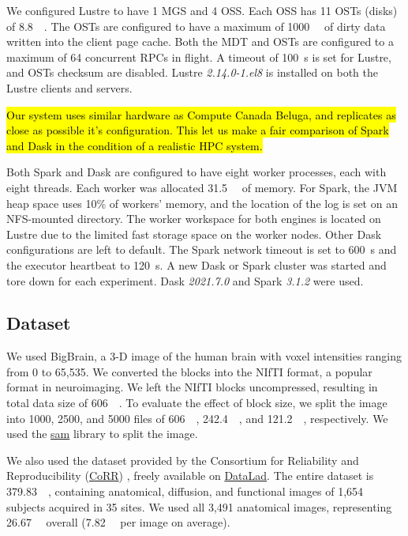 \documentclass[AMA,STIX1COL]{WileyNJD-v2}
\newcommand{\HL}[1]{\hl{#1}}
\begin{document}
We configured Lustre to have 1 MGS and 4 OSS.
Each OSS has 11 OSTs (disks) of \SI{8.8}{\tebi\byte}.
The OSTs are configured to have a maximum of \SI{1000}{\mebi\byte} of dirty data written into the client page cache.
Both the MDT and OSTs are configured to a maximum of 64 concurrent RPCs in flight.
A timeout of \SI{100}{\second} is set for Lustre, and OSTs checksum are disabled.
Lustre \textit{2.14.0-1.el8} is installed on both the Lustre clients and servers.
		
\HL{Our system uses similar hardware as Compute Canada Beluga, and replicates as
	close as possible it's configuration.
	This let us make a fair comparison of Spark and Dask in the condition of a realistic
HPC system.}
			
Both Spark and Dask are configured to have eight worker processes, each with eight threads.
Each worker was allocated \SI{31.5}{\gibi\byte} of memory.
For Spark, the JVM heap space uses 10\% of workers' memory, and the location of the log is set on an NFS-mounted directory.
The worker workspace for both engines is located on Lustre due to the limited fast storage space on the worker nodes.
Other Dask configurations are left to default.
The Spark network timeout is set to \SI{600}{\second} and the executor heartbeat to \SI{120}{\second}.
A new Dask or Spark cluster was started and tore down for each experiment.
Dask \textit{2021.7.0} and Spark \textit{3.1.2} were used.
			
\subsection{Dataset}
We used BigBrain\cite{Amunts:13}, a 3-D image of the human brain with voxel
intensities ranging from 0 to 65,535. We converted the blocks into the
NIfTI format, a popular format in neuroimaging. We left the NIfTI blocks
uncompressed, resulting in total data size of \SI{606}{\gibi\byte}. To
evaluate the effect of block size, we split the image into 1000, 2500,
and 5000 files of \SI{606}{\mebi\byte}, \SI{242.4}{\mebi\byte}, and
\SI{121.2}{\mebi\byte}, respectively.
We used the \href{https://github.com/big-data-lab-team/sam}{sam} library to split the image.
				
We also used the dataset provided by the Consortium for Reliability and
Reproducibility
(\href{http://fcon_1000.projects.nitrc.org/indi/CoRR/html/}{CoRR})
\cite{zuo2014open}, freely available on
\href{https://datasets.datalad.org/?dir=/corr/RawDataBIDS}{DataLad}.
The entire dataset is \SI{379.83}{\gibi\byte}, containing anatomical, diffusion,
and functional images of 1,654 subjects acquired in 35 sites.
We used all 3,491 anatomical images, representing \SI{26.67}{\gibi\byte} overall
(\SI{7.82}{\mebi\byte} per image on average).
				
\end{document}
